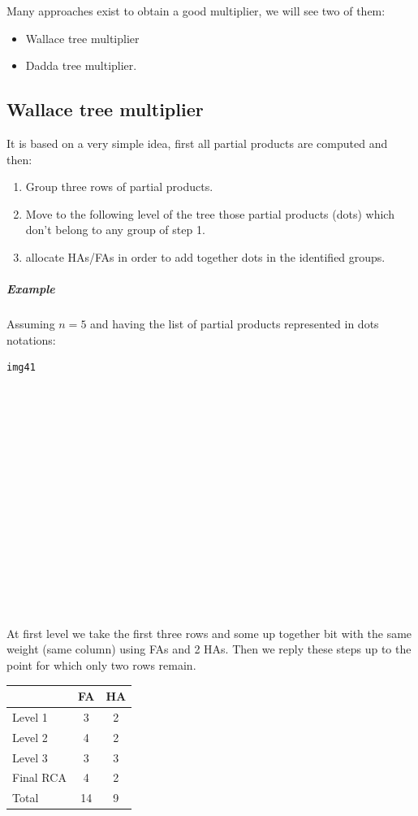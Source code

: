 Many approaches exist to obtain a good multiplier, we will see two of them:
\begin{itemize}
  \item Wallace tree multiplier
  \item Dadda tree multiplier.
\end{itemize}

\subsection{Wallace tree multiplier}
It is based on a very simple idea, first all partial products are computed and then:
\begin{enumerate}
  \item Group three rows of partial products.
  \item Move to the following level of the tree those partial products (dots) which don't belong to any group of step 1.
  \item allocate HAs/FAs in order to add together dots in the identified groups.
\end{enumerate}

\subparagraph{Example}
Assuming $n=5$ and having the list of partial products represented in dots notations:
\begin{verbatim}
img41
















\end{verbatim}

At first level we take the first three rows and some up together bit with the same weight (same column) using FAs and 2 HAs. Then we reply these steps up to the point for which only two rows remain.

\begin{center}
  \begin{tabular}{|l|c|c|}
    \hline
     & FA & HA\\
     \hline
     Level 1&   3&    2\\
     Level 2&   4&    2\\
     Level 3&   3&    3\\
     Final RCA&   4&    2\\
     \hline
     Total&     14&   9\\
     \hline
  \end{tabular}
\end{center}

